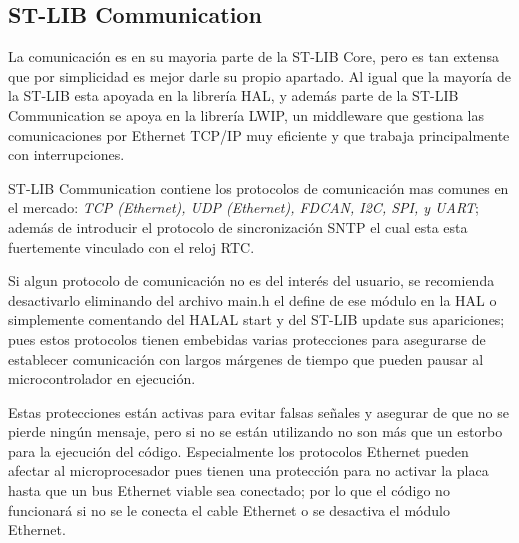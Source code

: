 \documentclass{report}
\begin{document}
\subsection{ST-LIB Communication}
La comunicación es en su mayoria parte de la ST-LIB Core, pero es tan extensa que por simplicidad es mejor darle su propio apartado. Al igual que la mayoría de la ST-LIB esta apoyada en la librería HAL, y además parte de la ST-LIB Communication se apoya en la librería LWIP, un middleware que gestiona las comunicaciones por Ethernet TCP/IP muy eficiente y que trabaja principalmente con interrupciones. 
\par \vspace{0.3cm}
ST-LIB Communication contiene los protocolos de comunicación mas comunes en el mercado: \textit{TCP (Ethernet), UDP (Ethernet), FDCAN, I2C, SPI, y UART}; además de introducir el protocolo de sincronización SNTP el cual esta esta fuertemente vinculado con el reloj RTC. \par \vspace{0.3cm}
Si algun protocolo de comunicación no es del interés del usuario, se recomienda desactivarlo eliminando del archivo main.h el define de ese módulo en la HAL o simplemente comentando del HALAL start y del ST-LIB update sus apariciones; pues estos protocolos tienen embebidas varias protecciones para asegurarse de establecer comunicación con largos márgenes de tiempo que pueden pausar al microcontrolador en ejecución. \par \vspace{0.3cm}
Estas protecciones están activas para evitar falsas señales y asegurar de que no se pierde ningún mensaje, pero si no se están utilizando no son más que un estorbo para la ejecución del código. Especialmente los protocolos Ethernet pueden afectar al microprocesador pues tienen una protección para no activar la placa hasta que un bus Ethernet viable sea conectado; por lo que el código no funcionará si no se le conecta el cable Ethernet o se desactiva el módulo Ethernet. 
\end{document}
